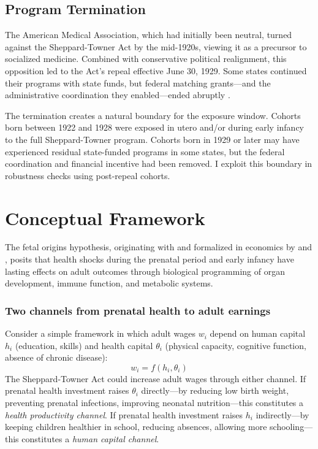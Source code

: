 \documentclass[12pt]{article}
\begin{document}
\subsection{Program Termination}

The American Medical Association, which had initially been neutral, turned against the Sheppard-Towner Act by the mid-1920s, viewing it as a precursor to socialized medicine. Combined with conservative political realignment, this opposition led to the Act's repeal effective June 30, 1929. Some states continued their programs with state funds, but federal matching grants---and the administrative coordination they enabled---ended abruptly \citep{lemon1973, moehlingthomasson2012}.

The termination creates a natural boundary for the exposure window. Cohorts born between 1922 and 1928 were exposed in utero and/or during early infancy to the full Sheppard-Towner program. Cohorts born in 1929 or later may have experienced residual state-funded programs in some states, but the federal coordination and financial incentive had been removed. I exploit this boundary in robustness checks using post-repeal cohorts.


\section{Conceptual Framework}

The fetal origins hypothesis, originating with \citet{barker1990} and formalized in economics by \citet{almond2006} and \citet{almondcurrie2011}, posits that health shocks during the prenatal period and early infancy have lasting effects on adult outcomes through biological programming of organ development, immune function, and metabolic systems.

\subsubsection*{Two channels from prenatal health to adult earnings} Consider a simple framework in which adult wages $w_i$ depend on human capital $h_i$ (education, skills) and health capital $\theta_i$ (physical capacity, cognitive function, absence of chronic disease):
\begin{equation}
w_i = f(h_i, \theta_i) \label{eq:wage}
\end{equation}
The Sheppard-Towner Act could increase adult wages through either channel. If prenatal health investment raises $\theta_i$ directly---by reducing low birth weight, preventing prenatal infections, improving neonatal nutrition---this constitutes a \textit{health productivity channel}. If prenatal health investment raises $h_i$ indirectly---by keeping children healthier in school, reducing absences, allowing more schooling---this constitutes a \textit{human capital channel}.
\end{document}
